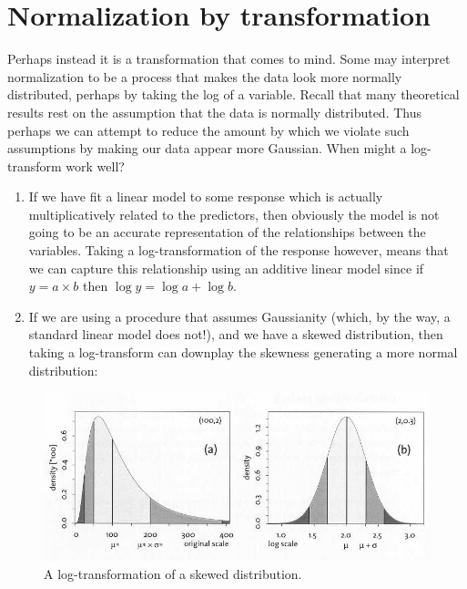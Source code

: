 \section{Normalization by transformation}

Perhaps instead it is a transformation that comes to mind. Some may interpret normalization to be a process that makes the data look more normally distributed, perhaps by taking the log of a variable. Recall that many theoretical results rest on the assumption that the data is normally distributed. Thus perhaps we can attempt to reduce the amount by which we violate such assumptions by making our data appear more Gaussian. When might a log-transform work well? 

\begin{enumerate}
\item If we have fit a linear model to some response which is actually multiplicatively related to the predictors, then obviously the model is not going to be an accurate representation of the relationships between the variables. Taking a log-transformation of the response however, means that we can capture this relationship using an additive linear model since if $y = a \times b$ then $\log y = \log a + \log b$. 
\item If we are using a procedure that assumes Gaussianity (which, by the way, a standard linear model does not!), and we have a skewed distribution, then taking a log-transform can downplay the skewness generating a more normal distribution:
\end{enumerate}


\begin{figure}[H]
\begin{center}
\includegraphics[scale=0.7]{log.jpg}
\end{center}
\caption{A log-transformation of a skewed distribution.}
\label{fig:log}
\end{figure}


